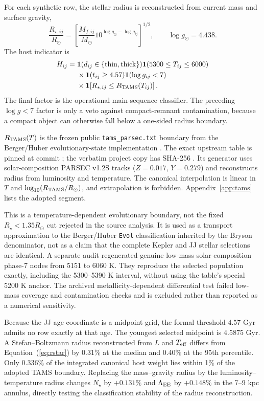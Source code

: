 For each synthetic row, the stellar radius is reconstructed from current mass and surface gravity,
\begin{equation}
 \frac{R_{\star,ij}}{R_\odot}
 =\left[
 \frac{M_{f,ij}}{M_\odot}
 10^{\log g_\odot-\log g_{ij}}
 \right]^{1/2},
 \qquad \log g_\odot=4.438.
 \label{eq:rstar}
\end{equation}
The host indicator is
\begin{align}
 H_{ij}={}&
 \mathbf{1}(d_{ij}\in\{\mathrm{thin},\mathrm{thick}\})
 \mathbf{1}(5300\leq T_{ij}\leq6000)\nonumber\\
 &\times\mathbf{1}(t_{ij}\geq4.57)
 \mathbf{1}(\log g_{ij}<7)\nonumber\\
 &\times\mathbf{1}\!\left[R_{\star,ij}\leq
 R_{\rm TAMS}(T_{ij})\right].
 \label{eq:host_indicator}
\end{align}
The final factor is the operational main-sequence classifier. The preceding $\log g<7$ factor is only a veto against compact-remnant contamination, because a compact object can otherwise fall below a one-sided radius boundary.

$R_{\rm TAMS}(T)$ is the frozen public \texttt{tams\_parsec.txt} boundary from the Berger/Huber evolutionary-state implementation \citep{Berger2018,HuberEvolstate}. The exact upstream table is pinned at commit ; the verbatim project copy has SHA-256 . Its generator uses solar-composition PARSEC v1.2S tracks ($Z=0.017$, $Y=0.279$) and reconstructs radius from luminosity and temperature. The canonical interpolation is linear in $T$ and $\log_{10}(R_{\rm TAMS}/R_\odot)$, and extrapolation is forbidden. Appendix~\ref{app:tams} lists the adopted segment.

This is a temperature-dependent evolutionary boundary, not the fixed $R_\star<1.35R_\odot$ cut rejected in the source analysis. It is used as a transport approximation to the Berger/Huber \texttt{Evol} classification inherited by the Bryson denominator, not as a claim that the complete Kepler and JJ stellar selections are identical. A separate audit regenerated genuine low-mass solar-composition phase-7 nodes from 5151 to 6060 K. They reproduce the selected population exactly, including the 5300--5390 K interval, without using the table's special 5200 K anchor. The archived metallicity-dependent differential test failed low-mass coverage and contamination checks and is excluded rather than reported as a numerical sensitivity.

Because the JJ age coordinate is a midpoint grid, the formal threshold $4.57$ Gyr admits no row exactly at that age. The youngest selected midpoint is 4.5875 Gyr. A Stefan--Boltzmann radius reconstructed from $L$ and $T_{\rm eff}$ differs from Equation~(\ref{eq:rstar}) by 0.31\% at the median and 0.40\% at the 95th percentile. Only 0.336\% of the integrated canonical host weight lies within 1\% of the adopted TAMS boundary. Replacing the mass--gravity radius by the luminosity--temperature radius changes $N_\star$ by $+0.131\%$ and $\Lambda_{\rm EE}$ by $+0.148\%$ in the 7--9 kpc annulus, directly testing the classification stability of the radius reconstruction.

